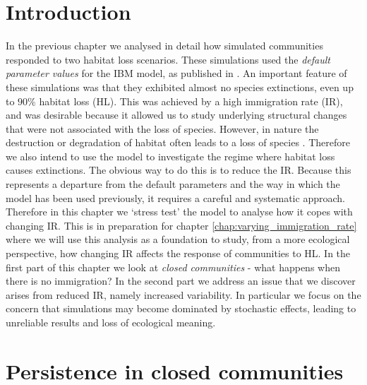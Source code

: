 

\section{Introduction}

In the previous chapter we analysed in detail how simulated communities responded to two habitat loss scenarios. These simulations used the \emph{default parameter values} for the IBM model, as published in \cite{lurgi2015effects}. An important feature of these simulations was that they exhibited almost no species extinctions, even up to $90\%$ habitat loss (HL). This was achieved by a high immigration rate (IR), and was desirable because it allowed us to study underlying structural changes that were not associated with the loss of species. However, in nature the destruction or degradation of habitat often leads to a loss of species \cite{newbold2015global, foley2005global}. Therefore we also intend to use the model to investigate the regime where habitat loss causes extinctions. The obvious way to do this is to reduce the IR. Because this represents a departure from the default parameters and the way in which the model has been used previously, it requires a careful and systematic approach. Therefore in this chapter we `stress test' the model to analyse how it copes with changing IR. This is in preparation for chapter \ref{chap:varying_immigration_rate} where we will use this analysis as a foundation to study, from a more ecological perspective, how changing IR affects the response of communities to HL. In the first part of this chapter we look at \emph{closed communities} - what happens when there is no immigration? In the second part we address an issue that we discover arises from reduced IR, namely increased variability. In particular we focus on the concern that simulations may become dominated by stochastic effects, leading to unreliable results and loss of ecological meaning.

\section{Persistence in closed communities}
\label{sec:closed_communities}


